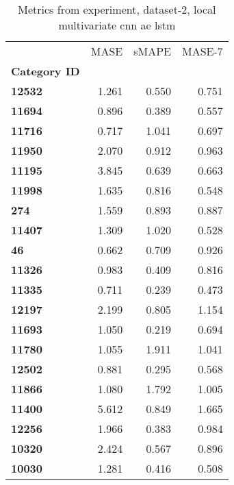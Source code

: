 \begin{table}[h]
\centering
\caption{Metrics from experiment, dataset-2, local multivariate cnn ae lstm}
\label{table:local-multivariate-cnn-ae-lstm-dataset-2}
\begin{tabular}{lrrr}
\toprule
{} &   MASE &  sMAPE &  MASE-7 \\
\textbf{Category ID} &        &        &         \\
\midrule
\textbf{12532      } &  1.261 &  0.550 &   0.751 \\
\textbf{11694      } &  0.896 &  0.389 &   0.557 \\
\textbf{11716      } &  0.717 &  1.041 &   0.697 \\
\textbf{11950      } &  2.070 &  0.912 &   0.963 \\
\textbf{11195      } &  3.845 &  0.639 &   0.663 \\
\textbf{11998      } &  1.635 &  0.816 &   0.548 \\
\textbf{274        } &  1.559 &  0.893 &   0.887 \\
\textbf{11407      } &  1.309 &  1.020 &   0.528 \\
\textbf{46         } &  0.662 &  0.709 &   0.926 \\
\textbf{11326      } &  0.983 &  0.409 &   0.816 \\
\textbf{11335      } &  0.711 &  0.239 &   0.473 \\
\textbf{12197      } &  2.199 &  0.805 &   1.154 \\
\textbf{11693      } &  1.050 &  0.219 &   0.694 \\
\textbf{11780      } &  1.055 &  1.911 &   1.041 \\
\textbf{12502      } &  0.881 &  0.295 &   0.568 \\
\textbf{11866      } &  1.080 &  1.792 &   1.005 \\
\textbf{11400      } &  5.612 &  0.849 &   1.665 \\
\textbf{12256      } &  1.966 &  0.383 &   0.984 \\
\textbf{10320      } &  2.424 &  0.567 &   0.896 \\
\textbf{10030      } &  1.281 &  0.416 &   0.508 \\
\bottomrule
\end{tabular}
\end{table}
